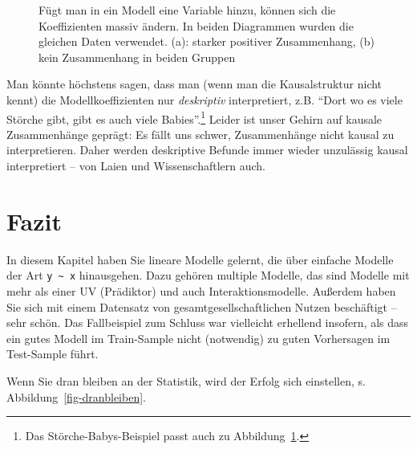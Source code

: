 \documentclass[
  letterpaper,
  twoside,
  open=any]{scrbook}
\theoremstyle{definition}
\theoremstyle{definition}
\theoremstyle{definition}
\theoremstyle{remark}
\begin{document}
\begin{figure}
\begin{minipage}{0.45\linewidth}
{}


\end{minipage}%

\caption{\label{fig-confounder}Fügt man in ein Modell eine Variable
hinzu, können sich die Koeffizienten massiv ändern. In beiden Diagrammen
wurden die gleichen Daten verwendet. (a): starker positiver
Zusammenhang, (b) kein Zusammenhang in beiden Gruppen}

\end{figure}%

Man könnte höchstens sagen, dass man (wenn man die Kausalstruktur nicht
kennt) die Modellkoeffizienten nur \emph{deskriptiv} interpretiert, z.B.
\enquote{Dort wo es viele Störche gibt, gibt es auch viele
Babies}.\footnote{Das Störche-Babys-Beispiel passt auch zu
  Abbildung~\ref{fig-confounder}.} Leider ist unser Gehirn auf kausale
Zusammenhänge geprägt: Es fällt uns schwer, Zusammenhänge nicht kausal
zu interpretieren. Daher werden deskriptive Befunde immer wieder
unzulässig kausal interpretiert -- von Laien und Wissenschaftlern auch.

\section{Fazit}\label{fazit-4}

In diesem Kapitel haben Sie lineare Modelle gelernt, die über einfache
Modelle der Art \texttt{y\ \textasciitilde{}\ x} hinausgehen. Dazu
gehören multiple Modelle, das sind Modelle mit mehr als einer UV
(Prädiktor) und auch Interaktionsmodelle. Außerdem haben Sie sich mit
einem Datensatz von gesamtgesellschaftlichen Nutzen beschäftigt -- sehr
schön. Das Fallbeispiel zum Schluss war vielleicht erhellend insofern,
als dass ein gutes Modell im Train-Sample nicht (notwendig) zu guten
Vorhersagen im Test-Sample führt.

Wenn Sie dran bleiben an der Statistik, wird der Erfolg sich einstellen,
s. Abbildung~\ref{fig-dranbleiben}.
\end{document}
